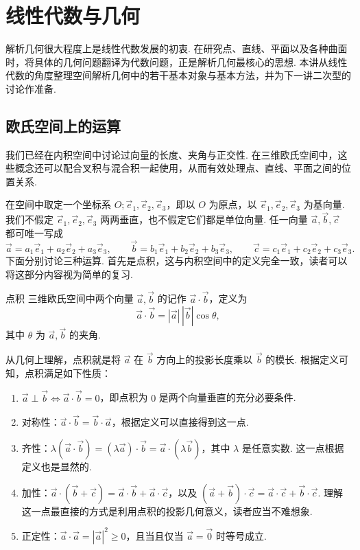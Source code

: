 \chapter{线性代数与几何} \label{chap:线性代数与几何}

解析几何很大程度上是线性代数发展的初衷. 在研究点、直线、平面以及各种曲面时，将具体的几何问题翻译为代数问题，正是解析几何最核心的思想. 本讲从线性代数的角度整理空间解析几何中的若干基本对象与基本方法，并为下一讲二次型的讨论作准备.

\section{欧氏空间上的运算}

我们已经在内积空间中讨论过向量的长度、夹角与正交性. 在三维欧氏空间中，这些概念还可以配合叉积与混合积一起使用，从而有效处理点、直线、平面之间的位置关系.

在空间中取定一个坐标系 $O;\vec{e}_1,\vec{e}_2,\vec{e}_3$，即以 $O$ 为原点，以 $\vec{e}_1,\vec{e}_2,\vec{e}_3$ 为基向量. 我们不假定 $\vec{e}_1,\vec{e}_2,\vec{e}_3$ 两两垂直，也不假定它们都是单位向量. 任一向量 $\vec{a},\vec{b},\vec{c}$ 都可唯一写成
\[
    \vec{a} = a_1 \vec{e}_1 + a_2 \vec{e}_2 + a_3 \vec{e}_3,\qquad
    \vec{b} = b_1 \vec{e}_1 + b_2 \vec{e}_2 + b_3 \vec{e}_3,\qquad
    \vec{c} = c_1 \vec{e}_1 + c_2 \vec{e}_2 + c_3 \vec{e}_3.
\]
下面分别讨论三种运算. 首先是点积，这与内积空间中的定义完全一致，读者可以将这部分内容视为简单的复习.

\begin{definition}{点积}{} 
    三维欧氏空间中两个向量 $\vec{a}, \vec{b}$ 的记作 $\vec{a}\cdot\vec{b}$，定义为
    \[
        \vec{a}\cdot\vec{b} = |\vec{a}|\,|\vec{b}|\cos\theta,
    \]
    其中 $\theta$ 为 $\vec{a}, \vec{b}$ 的夹角.
\end{definition}

从几何上理解，点积就是将 $\vec{a}$ 在 $\vec{b}$ 方向上的投影长度乘以 $\vec{b}$ 的模长. 根据定义可知，点积满足如下性质：

\begin{enumerate}
    \item $\vec{a}\perp \vec{b} \iff \vec{a}\cdot\vec{b} = 0$，即点积为 $0$ 是两个向量垂直的充分必要条件.
    \item 对称性：$\vec{a}\cdot\vec{b} = \vec{b}\cdot\vec{a}$，根据定义可以直接得到这一点.
    \item 齐性：$\lambda(\vec{a}\cdot\vec{b}) = (\lambda \vec{a})\cdot\vec{b} = \vec{a}\cdot(\lambda \vec{b})$，其中 $\lambda$ 是任意实数. 这一点根据定义也是显然的.
    \item 加性：$\vec{a}\cdot(\vec{b} + \vec{c}) = \vec{a}\cdot\vec{b} + \vec{a}\cdot\vec{c}$，以及 $(\vec{a} + \vec{b})\cdot\vec{c} = \vec{a}\cdot\vec{c} + \vec{b}\cdot\vec{c}$. 理解这一点最直接的方式是利用点积的投影几何意义，读者应当不难想象.
    \item 正定性：$\vec{a}\cdot\vec{a} = |\vec{a}|^2 \geqslant 0$，且当且仅当 $\vec{a} = \vec{0}$ 时等号成立.
\end{enumerate}

